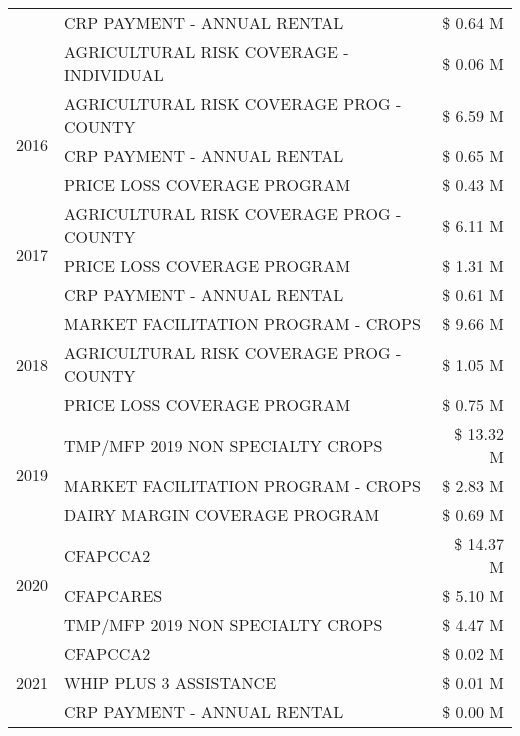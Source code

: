 \begin{tabular}{llr}
 & CRP PAYMENT - ANNUAL RENTAL & \$ 0.64 M \\
 & AGRICULTURAL RISK COVERAGE - INDIVIDUAL & \$ 0.06 M \\
\cline{1-3}
\multirow[t]{3}{*}{2016} & AGRICULTURAL RISK COVERAGE PROG - COUNTY & \$ 6.59 M \\
 & CRP PAYMENT - ANNUAL RENTAL & \$ 0.65 M \\
 & PRICE LOSS COVERAGE PROGRAM & \$ 0.43 M \\
\cline{1-3}
\multirow[t]{3}{*}{2017} & AGRICULTURAL RISK COVERAGE PROG - COUNTY & \$ 6.11 M \\
 & PRICE LOSS COVERAGE PROGRAM & \$ 1.31 M \\
 & CRP PAYMENT - ANNUAL RENTAL & \$ 0.61 M \\
\cline{1-3}
\multirow[t]{3}{*}{2018} & MARKET FACILITATION PROGRAM - CROPS & \$ 9.66 M \\
 & AGRICULTURAL RISK COVERAGE PROG - COUNTY & \$ 1.05 M \\
 & PRICE LOSS COVERAGE PROGRAM & \$ 0.75 M \\
\cline{1-3}
\multirow[t]{3}{*}{2019} & TMP/MFP 2019 NON SPECIALTY CROPS & \$ 13.32 M \\
 & MARKET FACILITATION PROGRAM - CROPS & \$ 2.83 M \\
 & DAIRY MARGIN COVERAGE PROGRAM & \$ 0.69 M \\
\cline{1-3}
\multirow[t]{3}{*}{2020} & CFAPCCA2 & \$ 14.37 M \\
 & CFAPCARES & \$ 5.10 M \\
 & TMP/MFP 2019 NON SPECIALTY CROPS & \$ 4.47 M \\
\cline{1-3}
\multirow[t]{3}{*}{2021} & CFAPCCA2 & \$ 0.02 M \\
 & WHIP PLUS 3 ASSISTANCE & \$ 0.01 M \\
 & CRP PAYMENT - ANNUAL RENTAL & \$ 0.00 M \\
\cline{1-3}
\bottomrule
\end{tabular}
